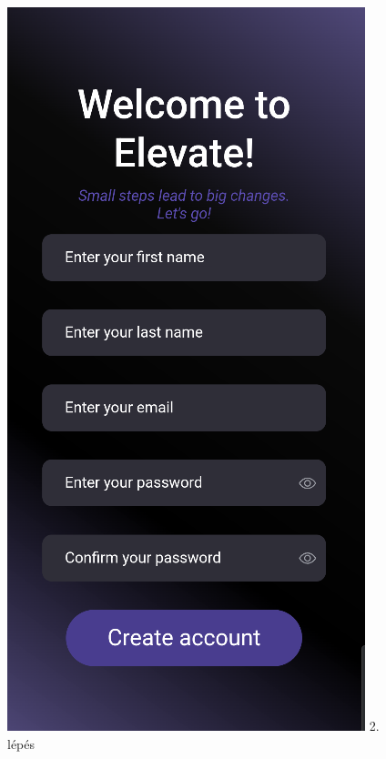 \documentclass[12pt]{report}
\begin{document}
\begin{figure}[H]
\begin{minipage}[b]{0.23\textwidth}
        \centering
        \includegraphics[width=\linewidth]{src/loginpage2.png}
       2. lépés
    \end{minipage}
    \hfill
    \begin{minipage}[b]{0.23\textwidth}

\end{minipage}
\end{figure}
\end{document}
